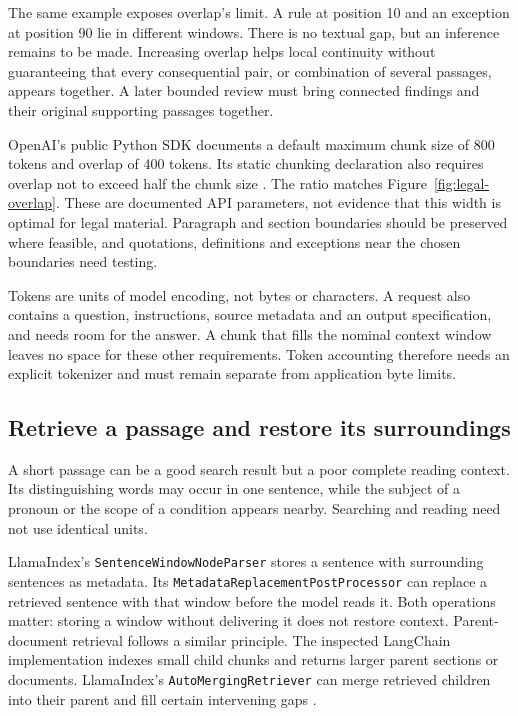 The same example exposes overlap's limit. A rule at position 10 and an
exception at position 90 lie in different windows. There is no textual gap,
but an inference remains to be made. Increasing overlap helps local
continuity without guaranteeing that every consequential pair, or combination
of several passages, appears together. A later bounded review must bring
connected findings and their original supporting passages together.

OpenAI's public Python SDK documents a default maximum chunk size of 800
tokens and overlap of 400 tokens. Its static chunking declaration also
requires overlap not to exceed half the chunk size
\citep{openaichunking2026}. The ratio matches Figure~\ref{fig:legal-overlap}.
These are documented API parameters, not evidence that this width is optimal
for legal material. Paragraph and section boundaries should be preserved
where feasible, and quotations, definitions and exceptions near the chosen
boundaries need testing.

Tokens are units of model encoding, not bytes or characters. A request also
contains a question, instructions, source metadata and an output specification,
and needs room for the answer. A chunk that fills the nominal context window
leaves no space for these other requirements. Token accounting therefore needs
an explicit tokenizer and must remain separate from application byte limits.

\subsection{Retrieve a passage and restore its surroundings}

A short passage can be a good search result but a poor complete reading
context. Its distinguishing words may occur in one sentence, while the
subject of a pronoun or the scope of a condition appears nearby. Searching
and reading need not use identical units.

LlamaIndex's \texttt{SentenceWindowNodeParser} stores a sentence with
surrounding sentences as metadata. Its
\texttt{MetadataReplacementPostProcessor} can replace a retrieved sentence
with that window before the model reads it. Both operations matter: storing
a window without delivering it does not restore context. Parent-document
retrieval follows a similar principle. The inspected LangChain implementation
indexes small child chunks and returns larger parent sections or documents.
LlamaIndex's \texttt{AutoMergingRetriever} can merge retrieved children into
their parent and fill certain intervening gaps
\citep{llamaindexcontext2026,langchainparent2025}.

